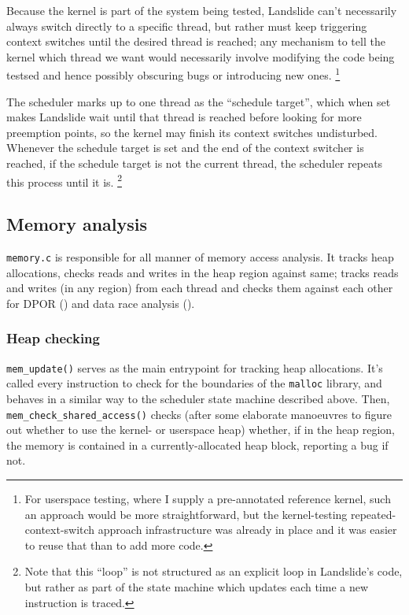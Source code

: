 Because the kernel is part of the system being tested, Landslide can't necessarily always switch directly to a specific thread,
but rather must keep triggering context switches until the desired thread is reached;
any mechanism to tell the kernel which thread we want would necessarily involve modifying the code being testsed
and hence possibly obscuring bugs or introducing new ones.%
\footnote{For userspace testing, where I supply a pre-annotated reference kernel,
such an approach would be more straightforward,
but the kernel-testing repeated-context-switch approach infrastructure was already in place
and it was easier to reuse that than to add more code.}

The scheduler marks up to one thread as the ``schedule target'',
which when set makes Landslide wait until that thread is reached before looking for more preemption points,
so the kernel may finish its context switches undisturbed.
Whenever the schedule target is set and the end of the context switcher is reached,
if the schedule target is not the current thread,
the scheduler repeats this process until it is.%
\footnote{Note that this ``loop'' is not structured as an explicit loop in Landslide's code,
but rather as part of the state machine which updates each time a new instruction is traced.}


\subsection{Memory analysis}
\label{sec:landslide-memory}

{\tt memory.c} is responsible for all manner of memory access analysis.
It tracks heap allocations, checks reads and writes in the heap region against same;
tracks reads and writes (in any region) from each thread
and checks them against each other
for DPOR (\sect{\ref{sec:landslide-dpor}})
and data race analysis (\sect{\ref{sect:landslide-datarace}}).

\subsubsection{Heap checking}

{\tt mem\_update()} serves as the main entrypoint for tracking heap allocations.
It's called every instruction to check for the boundaries of the {\tt malloc} library,
and behaves in a similar way to the scheduler state machine described above.
Then, {\tt mem\_check\_shared\_access()} checks
(after some elaborate manoeuvres to figure out whether to use the kernel- or userspace heap)
whether, if in the heap region, the memory is contained in a currently-allocated heap block,
reporting a bug if not.

